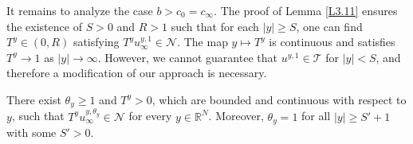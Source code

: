 \documentclass[reqno]{amsart}
\begin{document}
It remains to analyze the case $b > c_0 = c_\infty$. The proof of Lemma \ref{L3.11} ensures 
the existence of $S > 0$ and $R > 1$ such that for each $|y| \geq S$, one can find 
$T^y \in (0, R)$ satisfying $T^y u^{y,1}_\infty \in \mathcal{N}$. The map $y \mapsto T^y$ 
is continuous and satisfies $T^y \to 1$ as $|y| \to \infty$. However, we cannot guarantee  
that $u^{y,1}\in\mathcal{T}$ for $|y|< S$, and therefore a modification of our approach is necessary.

\begin{lemma}\label{L3.14} 
There exist $\theta_y\geq1$
and $T^y>0$, which are bounded and continuous with respect to $y$, 
such that $T^yu_\infty^{y,\theta_y}\in\mathcal{N}$ for every $y\in{\mathbb{R}^N}$. 
Moreover,  $\theta_y=1$ for all $|y|\geq S'+1$ with some $S'>0$.
\end{lemma}
\end{document}
